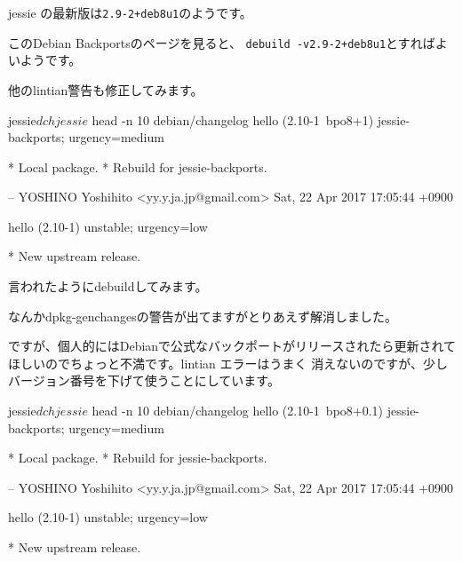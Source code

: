 \documentclass[mingoth,a4paper]{jsarticle}
\begin{document}
jessie の最新版は\verb|2.9-2+deb8u1|のようです。

このDebian Backportsのページを見ると、
\verb|debuild -v2.9-2+deb8u1|とすればよいようです。

他のlintian警告も修正してみます。

\begin{commandline}
jessie$ dch
jessie$ head -n 10 debian/changelog
hello (2.10-1~bpo8+1) jessie-backports; urgency=medium

  * Local package.
  * Rebuild for jessie-backports.

 -- YOSHINO Yoshihito <yy.y.ja.jp@gmail.com>  Sat, 22 Apr 2017 17:05:44 +0900

hello (2.10-1) unstable; urgency=low

  * New upstream release.
\end{commandline}

言われたようにdebuildしてみます。


なんかdpkg-genchangesの警告が出てますがとりあえず解消しました。

ですが、個人的にはDebianで公式なバックポートがリリースされたら更新されて
ほしいのでちょっと不満です。lintian エラーはうまく
消えないのですが、少しバージョン番号を下げて使うことにしています。

\begin{commandline}
jessie$ dch
jessie$ head -n 10 debian/changelog
hello (2.10-1~bpo8+0.1) jessie-backports; urgency=medium

  * Local package.
  * Rebuild for jessie-backports.

 -- YOSHINO Yoshihito <yy.y.ja.jp@gmail.com>  Sat, 22 Apr 2017 17:05:44 +0900

hello (2.10-1) unstable; urgency=low

  * New upstream release.
\end{commandline}
\end{document}
